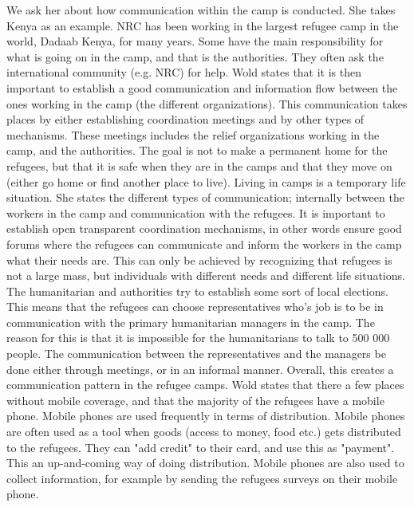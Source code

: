 We ask her about how communication within the camp is conducted. She takes Kenya as an example. NRC has been working in the largest refugee camp in the world, Dadaab Kenya, for many years.  Some have the main responsibility for what is going on in the camp, and that is the  authorities. They often ask the international community (e.g. NRC) for help. Wold states that it is then important to establish a good communication and information flow between the ones working in the camp (the different organizations). This communication takes places by either establishing coordination meetings and by other types of mechanisms. These meetings includes the relief organizations working in the camp, and the authorities. The goal is not to make a permanent home for the refugees, but that it is safe when they are in the camps and that they move on (either go home or find another place to live). Living in camps is a temporary life situation. She states the different types of communication; internally between the workers in the camp and communication with the refugees. It is important to establish open transparent coordination mechanisms, in other words ensure good forums where the refugees can communicate and inform the workers in the camp what their needs are. This can only be achieved by recognizing that refugees is not a large mass, but individuals with different needs and different life situations. The humanitarian and authorities try to establish some sort of local elections. This means that the refugees can choose representatives who's job is to be in communication with the primary humanitarian managers in the camp. The reason for this is that it is impossible for the humanitarians to talk to 500 000 people. The communication between the representatives and the managers be done either through meetings, or in an informal manner. Overall, this creates a communication pattern in the refugee camps. Wold states that there a few places without mobile coverage, and that the majority of the refugees have a mobile phone. Mobile phones are used frequently in terms of distribution. Mobile phones are often used as a tool when goods (access to money, food etc.) gets distributed to the refugees. They can "add credit" to their card, and use this as "payment". This an up-and-coming way of doing distribution. Mobile phones are also used to collect information, for example by sending the refugees surveys on their mobile phone. 


